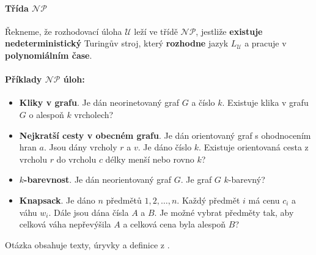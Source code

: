 \paragraph{Třída $\mathcal{NP}$} Řekneme, že rozhodovací úloha $\mathcal{U}$ leží ve třídě $\mathcal{NP}$, jestliže \textbf{existuje nedeterministický} Turingův stroj, který \textbf{rozhodne} jazyk $L_\mathcal{U}$ a pracuje v \textbf{polynomiálním čase}.

\paragraph{Příklady $\mathcal{NP}$ úloh:}
\begin{itemize}[itemsep=0pt]
    \item \textbf{\color{darkBrown}Kliky v grafu}. Je dán neorinetovaný graf $G$ a číslo $k$. Existuje klika v grafu $G$ o alespoň $k$ vrcholech?
    
    \item \textbf{\color{darkBrown}Nejkratší cesty v obecném grafu}. Je dán orientovaný graf s ohodnocením hran $a$. Jsou dány vrcholy $r$ a $v$. Je dáno číslo $k$. Existuje orientovaná cesta z vrcholu $r$ do vrcholu $c$ délky menší nebo rovno $k$?
    
    \item \textbf{\color{darkBrown}$k$-barevnost}. Je dán neorientovaný graf $G$. Je graf $G$ $k$-barevný?    
    \item \textbf{\color{darkBrown}Knapsack}. Je dáno $n$ předmětů $1,2, \dots, n$. Každý předmět $i$ má cenu $c_i$ a váhu $w_i$. Dále jsou dána čísla $A$ a $B$. Je možné vybrat předměty tak, aby celková váha nepřevýšila $A$ a celková cena byla alespoň $B$?
\end{itemize}

Otázka obsahuje texty, úryvky a definice z \cite{tal:demlova}.
